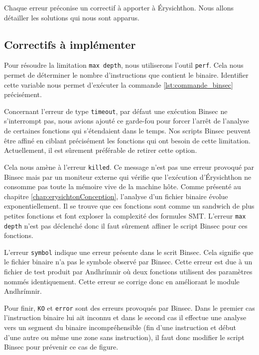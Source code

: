 Chaque erreur préconise un correctif à apporter à Érysichthon. Nous allons détailler les solutions qui nous sont apparus.

\subsection*{Correctifs à implémenter}

Pour résoudre la limitation \texttt{max depth}, nous utiliserons l'outil \texttt{perf}. Cela nous permet de déterminer le nombre d'instructions que contient le binaire. Identifier cette variable nous permet d'exécuter la commande \ref{lst:commande_binsec} précisément.\smallbreak

Concernant l'erreur de type \texttt{timeout}, par défaut une exécution Binsec ne s'interrompt pas, nous avions ajouté ce garde-fou pour forcer l'arrêt de l'analyse de certaines fonctions qui s'étendaient dans le temps. Nos scripts Binsec peuvent être affiné en ciblant précisément les fonctions qui ont besoin de cette limitation. Actuellement, il est sûrement préférable de retirer cette option.\smallbreak

Cela nous amène à l'erreur \texttt{killed}. Ce message n'est pas une erreur provoqué par Binsec mais par un moniteur externe qui vérifie que l'exécution d'Érysichthon ne consomme pas toute la mémoire vive de la machine hôte. Comme présenté au chapitre \ref{chap:erysichtonConception}, l'analyse d'un fichier binaire évolue exponentiellement. Il se trouve que ces fonctions sont comme un sandwich de plus petites fonctions et font exploser la complexité des formules SMT. L'erreur \texttt{max depth} n'est pas déclenché donc il faut sûrement affiner le script Binsec pour ces fonctions.

L'erreur \texttt{symbol} indique une erreur présente dans le scrit Binsec. Cela signifie que le fichier binaire n'a pas le symbole observé par Binsec. Cette erreur est due à un fichier de test produit par Andhrímnir où deux fonctions utilisent des paramètres nommés identiquement. Cette erreur se corrige donc en améliorant le module Andhrímnir.

Pour finir, \texttt{KO} et \texttt{error} sont des erreurs provoqués par Binsec. Dans le premier cas l'instruction binaire lui ait inconnu et dans le second cas il effectue une analyse vers un segment du binaire incompréhensible (fin d'une instruction et début d'une autre ou même une zone sans instruction), il faut donc modifier le script Binsec pour prévenir ce cas de figure.


